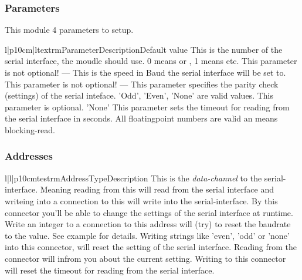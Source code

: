 \subsubsection{Parameters}
This module 4 parameters to setup. 
\begin{tableiii}{l|p{10cm}|l}{textrm}{Parameter}{Description}{Default value}
        {This is the number of the serial interface, the moudle should use. 0 
         means  or , 1 means  etc. This
         parameter is not optional!}
        {---}
        {This is the speed in Baud the serial interface will be set to. This
         parameter is not optional!} 
        {---}
        {This parameter specifies the parity check (settings) of the serial 
         inteface. 'Odd', 'Even', 'None' are valid values. This parameter
         is optional.}
        {'None'}
        {This parameter sets the timeout for reading from the serial 
         interface in seconds. All floatingpoint numbers are valid an
          means blocking-read.}
        {}
\end{tableiii}

\subsubsection{Addresses}
\begin{tableiii}{l|l|p{10cm}}{testrm}{Address}{Type}{Description}
\lineiii{---}
        {}
        {This is the \emph{data-channel} to the serial-interface. Meaning 
         reading from this will read from the serial interface and writeing
         into a connection to this will write into the serial-interface.}
        {}
        {By this connector you'll be able to change the settings of the serial
         interface at runtime. Write an integer to a connection to this address
         will (try) to reset the baudrate to the value. See example for details.}
        {}
        {Writing strings like 'even', 'odd' or 'none' into this connector, will
         reset the setting of the serial interface. Reading from the connector
         will infrom you about the current setting.}
        {}
        {Writing to this connector will reset the timeout for reading from 
         the serial interface.}
\end{tableiii}

